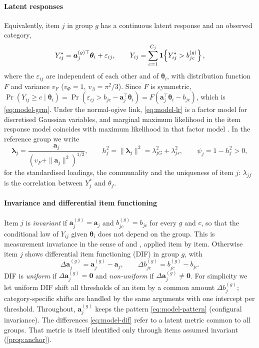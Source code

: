 \paragraph{Latent responses}
Equivalently, item $j$ in group $g$ has a continuous latent response and an observed category,
\begin{equation}\label{eq:model-lr}
  Y^*_{ij}=\bm a_j^{(g)\top}\bm\theta_i+\varepsilon_{ij},\qquad
  Y_{ij}=\sum_{c=1}^{C_j}\mathbf{1}\!\left\{Y^*_{ij}>b^{(g)}_{jc}\right\},
\end{equation}
where the $\varepsilon_{ij}$ are independent of each other and of $\bm\theta_i$, with distribution function $F$ and variance $v_F$ ($v_\Phi=1$, $v_\Lambda=\pi^2/3$). Since $F$ is symmetric, $\Pr(Y_{ij}\ge c\mid\bm\theta_i)=\Pr(\varepsilon_{ij}>b_{jc}-\bm a_j^\top\bm\theta_i)=F(\bm a_j^\top\bm\theta_i-b_{jc})$, which is \eqref{eq:model-grm}. Under the normal-ogive link, \eqref{eq:model-lr} is a factor model for discretised Gaussian variables, and marginal maximum likelihood in the item response model coincides with maximum likelihood in that factor model \citep{takane1987}. In the reference group we write
\begin{equation}\label{eq:model-std}
  \bm\lambda_j=\frac{\bm a_j}{(v_F+\|\bm a_j\|^2)^{1/2}},\qquad h_j^2=\|\bm\lambda_j\|^2=\lambda_{jG}^2+\lambda_{js}^2,\qquad \psi_j=1-h_j^2>0,
\end{equation}
for the standardised loadings, the communality and the uniqueness of item $j$: $\lambda_{jf}$ is the correlation between $Y^*_{j}$ and $\theta_f$.

\paragraph{Invariance and differential item functioning}
Item $j$ is \emph{invariant} if $\bm a^{(g)}_j=\bm a_j$ and $b^{(g)}_{jc}=b_{jc}$ for every $g$ and $c$, so that the conditional law of $Y_{ij}$ given $\bm\theta_i$ does not depend on the group. This is measurement invariance in the sense of \citet{meredith1993} and \citet{millsap2011}, applied item by item. Otherwise item $j$ shows differential item functioning (DIF) in group $g$, with
\begin{equation}\label{eq:model-dif}
  \Delta\bm a^{(g)}_j=\bm a^{(g)}_j-\bm a_j,\qquad \Delta b^{(g)}_{jc}=b^{(g)}_{jc}-b_{jc}.
\end{equation}
DIF is \emph{uniform} if $\Delta\bm a^{(g)}_j=\bm0$ and \emph{non-uniform} if $\Delta\bm a^{(g)}_j\neq\bm0$. For simplicity we let uniform DIF shift all thresholds of an item by a common amount $\Delta b^{(g)}_j$; category-specific shifts are handled by the same arguments with one intercept per threshold. Throughout, $\bm a_j^{(g)}$ keeps the pattern \eqref{eq:model-pattern} (configural invariance). The differences \eqref{eq:model-dif} refer to a latent metric common to all groups. That metric is itself identified only through items assumed invariant (\cref{prop:anchor}).

